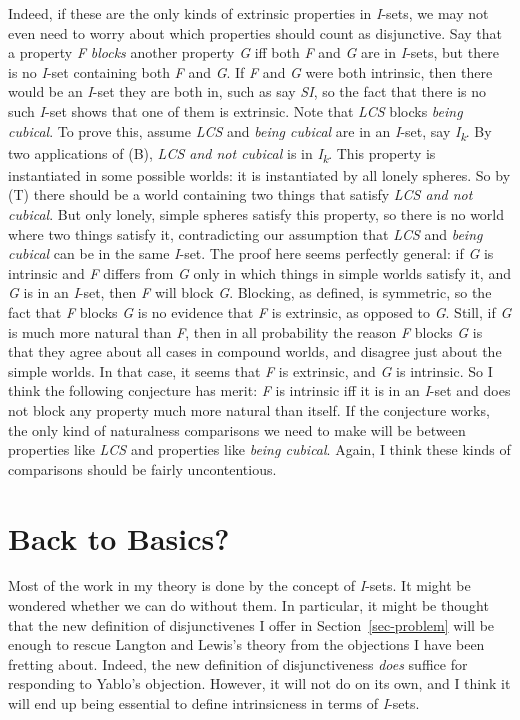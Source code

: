 \documentclass[
  10pt,
  letterpaper,
  DIV=11,
  numbers=noendperiod,
  twoside]{scrartcl}
\begin{document}
Indeed, if these are the only kinds of extrinsic properties in
\emph{I}-sets, we may not even need to worry about which properties
should count as disjunctive. Say that a property \emph{F} \emph{blocks}
another property \emph{G} iff both \emph{F} and \emph{G} are in
\emph{I}-sets, but there is no \emph{I}-set containing both \emph{F} and
\emph{G}. If \emph{F} and \emph{G} were both intrinsic, then there would
be an \emph{I}-set they are both in, such as say \emph{SI}, so the fact
that there is no such \emph{I}-set shows that one of them is extrinsic.
Note that \emph{LCS} blocks \emph{being cubical}. To prove this, assume
\emph{LCS} and \emph{being cubical} are in an \emph{I}-set, say
\emph{I\textsubscript{k}}. By two applications of (B), \emph{LCS and not
cubical} is in \emph{I\textsubscript{k}}. This property is instantiated
in some possible worlds: it is instantiated by all lonely spheres. So by
(T) there should be a world containing two things that satisfy \emph{LCS
and not cubical}. But only lonely, simple spheres satisfy this property,
so there is no world where two things satisfy it, contradicting our
assumption that \emph{LCS} and \emph{being cubical} can be in the same
\emph{I}-set. The proof here seems perfectly general: if \emph{G} is
intrinsic and \emph{F} differs from \emph{G} only in which things in
simple worlds satisfy it, and \emph{G} is in an \emph{I}-set, then
\emph{F} will block \emph{G}. Blocking, as defined, is symmetric, so the
fact that \emph{F} blocks \emph{G} is no evidence that \emph{F} is
extrinsic, as opposed to \emph{G}. Still, if \emph{G} is much more
natural than \emph{F}, then in all probability the reason \emph{F}
blocks \emph{G} is that they agree about all cases in compound worlds,
and disagree just about the simple worlds. In that case, it seems that
\emph{F} is extrinsic, and \emph{G} is intrinsic. So I think the
following conjecture has merit: \emph{F} is intrinsic iff it is in an
\emph{I}-set and does not block any property much more natural than
itself. If the conjecture works, the only kind of naturalness
comparisons we need to make will be between properties like \emph{LCS}
and properties like \emph{being cubical}. Again, I think these kinds of
comparisons should be fairly uncontentious.

\section{Back to Basics?}\label{back-to-basics}

Most of the work in my theory is done by the concept of \emph{I}-sets.
It might be wondered whether we can do without them. In particular, it
might be thought that the new definition of disjunctivenes I offer in
Section~\ref{sec-problem} will be enough to rescue Langton and Lewis's
theory from the objections I have been fretting about. Indeed, the new
definition of disjunctiveness \emph{does} suffice for responding to
Yablo's objection. However, it will not do on its own, and I think it
will end up being essential to define intrinsicness in terms of
\emph{I}-sets.
\end{document}

